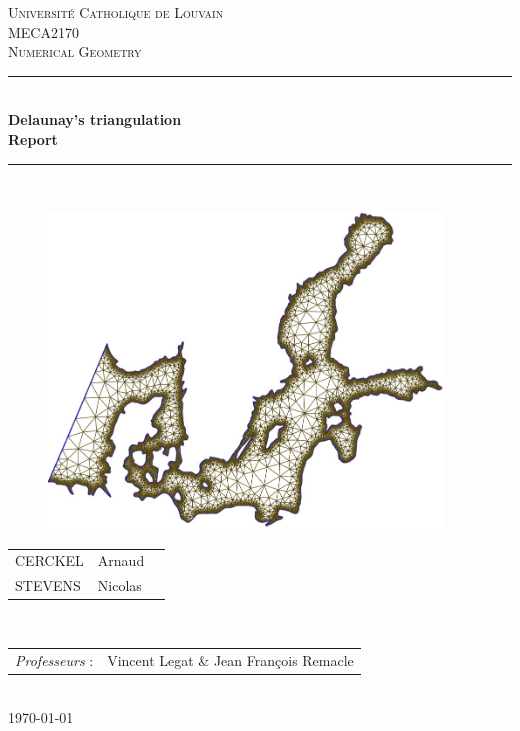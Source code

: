 \begin{titlepage}
\newcommand{\HRule}{\rule{\linewidth}{0.5mm}} %
\centering %
 
\null
\vspace{1cm}
\textsc{\Large Université Catholique de Louvain}\\[1cm] %
\textsc{\large MECA2170 \\[0.3cm] Numerical Geometry}\\[0.5cm] %


\HRule \\[0.4cm]
{ \LARGE \bfseries Delaunay's triangulation\\[0.4cm] %
\large \bfseries Report} \\[0.4cm]

\HRule \\[0.5cm]
 
\begin{figure}[!h]
	\begin{center}
		\includegraphics[width=10.5cm]{images/cover.jpg}
	\end{center}
\end{figure}


\large 
\centering
{\begin{tabular}{lll}
\textsc{CERCKEL} & Arnaud\\
\textsc{STEVENS} & Nicolas\\
\end{tabular}}
\\[1cm]

\normalsize
{\begin{tabular}{ll}
\textit{Professeurs} : & Vincent Legat \& Jean François Remacle\\
\end{tabular}}
\\[1cm]


{\normalsize \today}\\[2cm] %

\end{titlepage}
\newpage